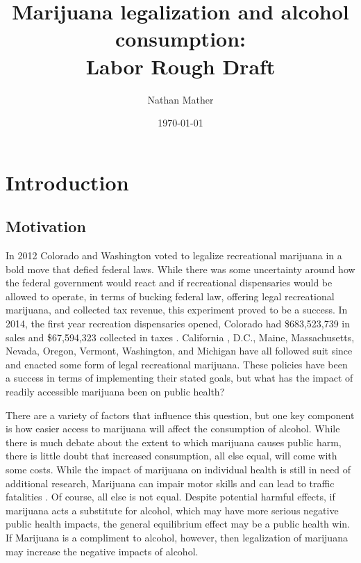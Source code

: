 \documentclass[11pt]{article}
\title{Marijuana legalization and alcohol consumption:\\
	Labor Rough Draft} %
\author{Nathan Mather} %
\date{\today} %
\begin{document}
	
	
\maketitle %

\setcounter{tocdepth}{3} %

\tableofcontents %

\section{Introduction}
\subsection{Motivation}

In 2012 Colorado and Washington voted to legalize recreational marijuana in a bold move that defied federal laws.  While there was some uncertainty around how the federal government would react and if recreational dispensaries would be allowed to operate, in terms of bucking federal law, offering legal recreational marijuana, and collected tax revenue, this experiment proved to be a success. In 2014, the first year recreation dispensaries opened, Colorado had \$683,523,739 in sales and \$67,594,323 collected in taxes \cite{Colorado_marijuana_sales}. California , D.C., Maine, Massachusetts, Nevada, Oregon, Vermont, Washington, and Michigan have all followed suit since and enacted some form of legal recreational marijuana. These policies have been a success in terms of implementing their stated goals, but what has the impact of readily accessible marijuana been on public health? \par

There are a variety of factors that influence this question, but one key component is how easier access to marijuana will affect the consumption of alcohol. While there is much debate about the extent to which marijuana causes public harm, there is little doubt that increased consumption, all else equal, will come with some costs. While the impact of marijuana on individual health is still in need of additional research, Marijuana can impair motor skills and can lead to traffic fatalities \cite{webmd_mj}. Of course, all else is not equal.  Despite potential harmful effects, if marijuana acts a substitute for alcohol, which may have more serious negative public health impacts, the general equilibrium effect may be a public health win. If Marijuana is a compliment to alcohol, however, then legalization of marijuana may increase the negative impacts of alcohol. \par
\end{document}

